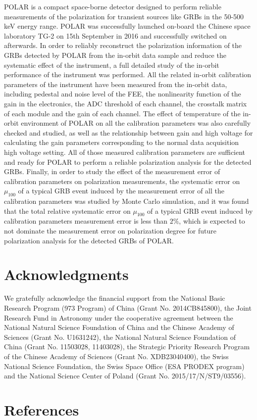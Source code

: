 \documentclass[preprint,sort&compress,12pt]{elsarticle}
\begin{document}
POLAR is a compact space-borne detector designed to perform reliable measurements of the polarization for transient sources like GRBs in the 50-500\,keV energy range. POLAR was successfully launched on-board the Chinese space laboratory TG-2 on 15th September in 2016 and successfully switched on afterwards. In order to reliably reconstruct the polarization information of the GRBs detected by POLAR from the in-orbit data sample and reduce the systematic effect of the instrument, a full detailed study of the in-orbit performance of the instrument was performed. All the related in-orbit calibration parameters of the instrument have been measured from the in-orbit data, including pedestal and noise level of the FEE, the nonlinearity function of the gain in the electronics, the ADC threshold of each channel, the crosstalk matrix of each module and the gain of each channel. The effect of temperature of the in-orbit environment of POLAR on all the calibration parameters was also carefully checked and studied, as well as the relationship between gain and high voltage for calculating the gain parameters corresponding to the normal data acquisition high voltage setting. All of those measured calibration parameters are sufficient and ready for POLAR to perform a reliable polarization analysis for the detected GRBs. Finally, in order to study the effect of the measurement error of calibration parameters on polarization measurements, the systematic error on $\mu_{100}$ of a typical GRB event induced by the measurement error of all the calibration parameters was studied by Monte Carlo simulation, and it was found that the total relative systematic error on $\mu_{100}$ of a typical GRB event induced by calibration parameters measurement error is less than $2\%$, which is expected to not dominate the measurement error on polarization degree for future polarization analysis for the detected GRBs of POLAR.

\section{Acknowledgments}

We gratefully acknowledge the financial support from the National Basic Research Program (973 Program) of China (Grant No. 2014CB845800), the Joint Research Fund in Astronomy under the cooperative agreement between the National Natural Science Foundation of China and the Chinese Academy of Sciences (Grant No. U1631242), the National Natural Science Foundation of China (Grant No. 11503028, 11403028), the Strategic Priority Research Program of the Chinese Academy of Sciences (Grant No. XDB23040400), the Swiss National Science Foundation, the Swiss Space Office (ESA PRODEX program) and the National Science Center of Poland (Grant No. 2015/17/N/ST9/03556).

\newpage

\section*{References}


\end{document}
